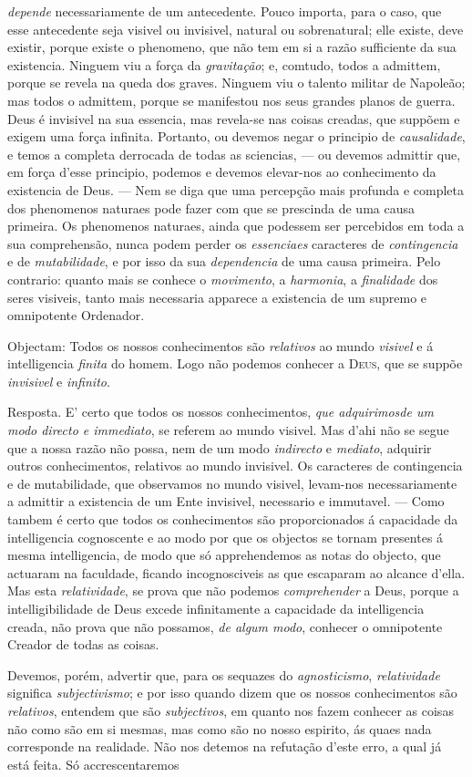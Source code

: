 \emph{depende} necessariamente de um antecedente. Pouco importa, para o caso, que esse antecedente seja visivel ou invisivel, natural ou sobrenatural; elle existe, deve existir, porque existe o phenomeno, que não tem em si a razão sufficiente da sua existencia. Ninguem viu a força da \emph{gravitação}; e, comtudo, todos a admittem, porque se revela na queda dos graves. Ninguem viu o talento militar de Napoleão; mas todos o admittem, porque se manifestou nos seus grandes planos de guerra. Deus é invisivel na sua essencia, mas revela-se nas coisas creadas, que suppõem e exigem uma força infinita. Portanto, ou devemos negar o principio de \emph{causalidade}, e temos a completa derrocada de todas as sciencias, --- ou devemos admittir que, em força d'esse principio, podemos e devemos elevar-nos ao conhecimento da existencia de Deus. --- Nem se diga que uma percepção mais profunda e completa dos phenomenos naturaes pode fazer com que se prescinda de uma causa primeira. Os phenomenos naturaes, ainda que podessem ser percebidos em toda a sua comprehensão, nunca podem perder os \emph{essenciaes} caracteres de \emph{contingencia} e de \emph{mutabilidade}, e por isso da sua \emph{dependencia} de uma causa primeira. Pelo contrario: quanto mais se conhece o \emph{movimento}, a \emph{harmonia}, a \emph{finalidade} dos seres visiveis, tanto mais necessaria apparece a existencia de um supremo e omnipotente Ordenador.\par Objectam: Todos os nossos conhecimentos são \emph{relativos} ao mundo \emph{visivel} e á intelligencia \emph{finita} do homem. Logo não podemos conhecer a \textsc{Deus}, que se suppõe \emph{invisivel} e \emph{infinito}.\par Resposta. E' certo que todos os nossos conhecimentos, \emph{que adquirimos}\emph{de um modo directo e immediato}, se referem ao mundo visivel. Mas d'ahi não se segue que a nossa razão não possa, nem de um modo \emph{indirecto} e \emph{mediato}, adquirir outros conhecimentos, relativos ao mundo invisivel. Os caracteres de contingencia e de mutabilidade, que observamos no mundo visivel, levam-nos necessariamente a admittir a existencia de um Ente invisivel, necessario e immutavel. --- Como tambem é certo que todos os conhecimentos são proporcionados á capacidade da intelligencia cognoscente e ao modo por que os objectos se tornam presentes á mesma intelligencia, de modo que só apprehendemos as notas do objecto, que actuaram na faculdade, ficando incognosciveis as que escaparam ao alcance d'ella. Mas esta \emph{relatividade}, se prova que não podemos \emph{comprehender} a Deus, porque a intelligibilidade de Deus excede infinitamente a capacidade da intelligencia creada, não prova que não possamos, \emph{de algum modo}, conhecer o omnipotente Creador de todas as coisas.\par Devemos, porém, advertir que, para os sequazes do \emph{agnosticismo}, \emph{relatividade} significa \emph{subjectivismo}; e por isso quando dizem que os nossos conhecimentos são \emph{relativos}, entendem que são \emph{subjectivos}, em quanto nos fazem conhecer as coisas não como são em si mesmas, mas como são no nosso espirito, ás quaes nada corresponde na realidade. Não nos detemos na refutação d'este erro, a qual já está feita. Só accrescentaremos 